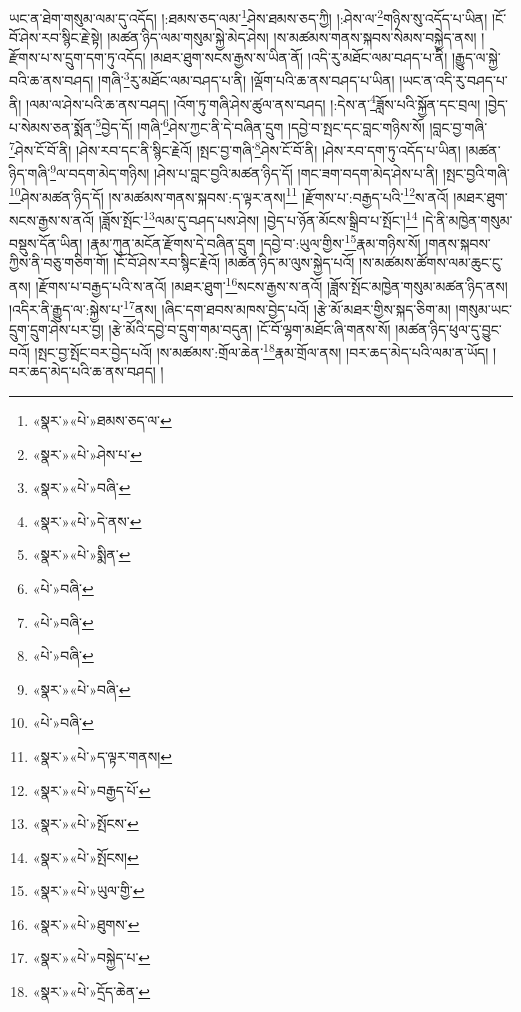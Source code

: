 ཡང་ན་ཐེག་གསུམ་ལམ་དུ་འདོད། །:ཐམས་ཅད་ལམ་\footnote{«སྣར་»«པེ་»ཐམས་ཅད་ལ་}ཤེས་ཐམས་ཅད་ཀྱི། །:ཤེས་ལ་\footnote{«སྣར་»«པེ་»ཤེས་པ་}གཉིས་སུ་འདོད་པ་ཡིན། །ངོ་བོ་ཤེས་རབ་སྙིང་རྗེ་སྟེ། །མཚན་ཉིད་ལམ་གསུམ་སྐྱེ་མེད་ཤེས། །ས་མཚམས་གནས་སྐབས་སེམས་བསྐྱེད་ནས། །རྫོགས་པ་ས་དྲུག་དག་ཏུ་འདོད། །མཐར་ཐུག་སངས་རྒྱས་ས་ཡིན་ནོ། །འདི་རུ་མཐོང་ལམ་བཤད་པ་ནི། །རྒྱུད་ལ་སྐྱེ་བའི་ཆ་ནས་བཤད། །གཞི་\footnote{«སྣར་»«པེ་»བཞི་}རུ་མཐོང་ལམ་བཤད་པ་ནི། །ལྡོག་པའི་ཆ་ནས་བཤད་པ་ཡིན། །ཡང་ན་འདི་རུ་བཤད་པ་ནི། །ལམ་ལ་ཤེས་པའི་ཆ་ནས་བཤད། །འོག་ཏུ་གཞི་ཤེས་ཚུལ་ནས་བཤད། །:དེས་ན་\footnote{«སྣར་»«པེ་»དེ་ནས་}ཟློས་པའི་སྐྱོན་དང་བྲལ། །བྱེད་པ་སེམས་ཅན་སྨོན་\footnote{«སྣར་»«པེ་»སྨིན་}བྱེད་དོ། །གཞི་\footnote{«པེ་»བཞི་}ཤེས་ཀྱང་ནི་དེ་བཞིན་དྲུག །དབྱེ་བ་སྤང་དང་བླང་གཉིས་སོ། །བླང་བྱ་གཞི་\footnote{«པེ་»བཞི་}ཤེས་ངོ་བོ་ནི། །ཤེས་རབ་དང་ནི་སྙིང་རྗེའོ། །སྤང་བྱ་གཞི་\footnote{«པེ་»བཞི་}ཤེས་ངོ་བོ་ནི། །ཤེས་རབ་དག་ཏུ་འདོད་པ་ཡིན། །མཚན་ཉིད་གཞི་\footnote{«སྣར་»«པེ་»བཞི་}ལ་བདག་མེད་གཉིས། །ཤེས་པ་བླང་བྱའི་མཚན་ཉིད་དོ། །གང་ཟག་བདག་མེད་ཤེས་པ་ནི། །སྤང་བྱའི་གཞི་\footnote{«པེ་»བཞི་}ཤེས་མཚན་ཉིད་དོ། །ས་མཚམས་གནས་སྐབས་:ད་ལྟར་ནས།\footnote{«སྣར་»«པེ་»ད་ལྟར་གནས།} །རྫོགས་པ་:བརྒྱད་པའི་\footnote{«སྣར་»«པེ་»བརྒྱད་པོ་}ས་ནའོ། །མཐར་ཐུག་སངས་རྒྱས་ས་ནའོ། །ཟློས་སྤོང་\footnote{«སྣར་»«པེ་»སྤོངས་}ལམ་དུ་བཤད་པས་ཤེས། །བྱེད་པ་ཉོན་མོངས་སྒྲིབ་པ་སྤོང་།\footnote{«སྣར་»«པེ་»སྤོངས།} །དེ་ནི་མཁྱེན་གསུམ་བསྡུས་དོན་ཡིན། །རྣམ་ཀུན་མངོན་རྫོགས་དེ་བཞིན་དྲུག །དབྱེ་བ་:ཡུལ་གྱིས་\footnote{«སྣར་»«པེ་»ཡུལ་གྱི་}རྣམ་གཉིས་སོ། །གནས་སྐབས་ཀྱིས་ནི་བཅུ་གཅིག་གོ། །ངོ་བོ་ཤེས་རབ་སྙིང་རྗེའོ། །མཚན་ཉིད་མ་ལུས་སྐྱེད་པའོ། །ས་མཚམས་ཚོགས་ལམ་ཆུང་ངུ་ནས། །རྫོགས་པ་བརྒྱད་པའི་ས་ནའོ། །མཐར་ཐུག་\footnote{«སྣར་»«པེ་»ཐུགས་}སངས་རྒྱས་ས་ནའོ། །ཟློས་སྤོང་མཁྱེན་གསུམ་མཚན་ཉིད་ནས། །འདིར་ནི་རྒྱུད་ལ་:སྐྱེས་པ་\footnote{«སྣར་»«པེ་»བསྐྱེད་པ་}ནས། །ཞིང་དག་ཐབས་མཁས་བྱེད་པའོ། །རྩེ་མོ་མཐར་གྱིས་སྐད་ཅིག་མ། །གསུམ་ཡང་དྲུག་དྲུག་ཤེས་པར་བྱ། །རྩེ་མོའི་དབྱེ་བ་དྲུག་གམ་བདུན། །ངོ་བོ་ལྷག་མཐོང་ཞི་གནས་སོ། །མཚན་ཉིད་ཕུལ་དུ་བྱུང་བའོ། །སྤང་བྱ་སྤོང་བར་བྱེད་པའོ། །ས་མཚམས་:གྲོལ་ཆེན་\footnote{«སྣར་»«པེ་»དྲོད་ཆེན་}རྣམ་གྲོལ་ནས། །བར་ཆད་མེད་པའི་ལམ་ན་ཡོད། །བར་ཆད་མེད་པའི་ཆ་ནས་བཤད། །
